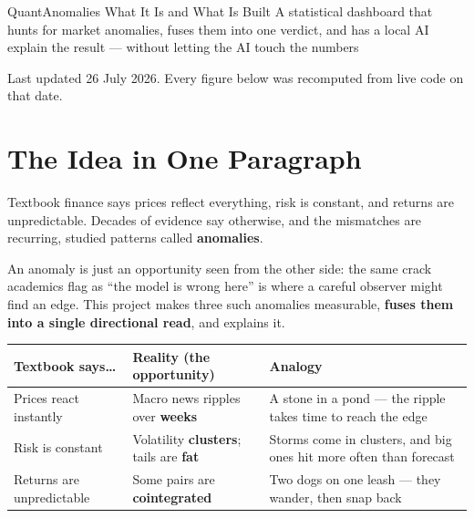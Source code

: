 \documentclass[11pt]{article}
\begin{document}
\thispagestyle{empty}

\titlebanner
  {QuantAnomalies}
  {What It Is and What Is Built}
  {A statistical dashboard that hunts for market anomalies, fuses them into one
   verdict, and has a local AI explain the result — without letting the AI touch
   the numbers}

\vspace{0.6em}
{\small\color{qmuted}Last updated 26 July 2026. Every figure below was recomputed
from live code on that date.}
\vspace{0.8em}

\section{The Idea in One Paragraph}
Textbook finance says prices reflect everything, risk is constant, and returns are
unpredictable. Decades of evidence say otherwise, and the mismatches are recurring,
studied patterns called \textbf{anomalies}.

\begin{opp}
An anomaly is just an opportunity seen from the other side: the same crack academics
flag as ``the model is wrong here'' is where a careful observer might find an edge.
This project makes three such anomalies measurable, \textbf{fuses them into a single
directional read}, and explains it.
\end{opp}

\begin{table}[h]
\renewcommand{\arraystretch}{1.35}
\begin{tabularx}{\linewidth}{Y Y Y}
\toprule
\textbf{\color{qnavy}Textbook says\ldots} & \textbf{\color{qnavy}Reality (the opportunity)} & \textbf{\color{qnavy}Analogy} \\
\midrule
Prices react instantly & Macro news ripples over \textbf{weeks} & A stone in a pond — the ripple takes time to reach the edge \\
Risk is constant & Volatility \textbf{clusters}; tails are \textbf{fat} & Storms come in clusters, and big ones hit more often than forecast \\
Returns are unpredictable & Some pairs are \textbf{cointegrated} & Two dogs on one leash — they wander, then snap back \\
\bottomrule
\end{tabularx}
\end{table}
\end{document}
